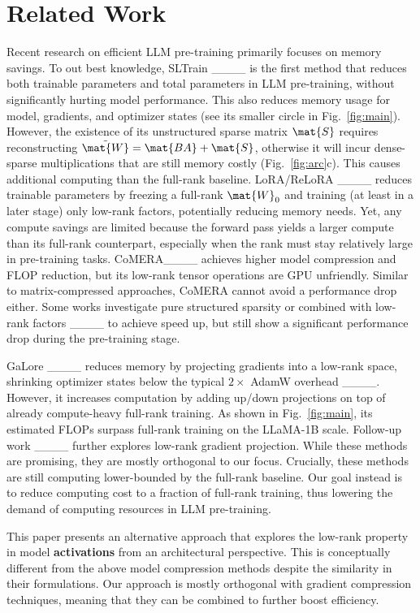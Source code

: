 \section{Related Work}
 Recent research on efficient LLM pre-training primarily focuses on memory savings. To out best knowledge, SLTrain ____ is the first method that reduces both trainable parameters and total parameters in LLM pre-training, without significantly hurting model performance. This also reduces memory usage for model, gradients, and optimizer states (see its smaller circle in Fig.~\ref{fig:main}). However, the existence of its unstructured sparse matrix $\mat{S}$ requires reconstructing $\tilde{\mat{W}} = \mat{BA} + \mat{S}$, otherwise it will incur dense-sparse multiplications that are still memory costly (Fig.~\ref{fig:arc}c). This causes additional computing than the full-rank baseline. LoRA/ReLoRA ____ reduces trainable parameters by freezing a full-rank $\mat{W}_0$ and training (at least in a later stage) only low-rank factors, potentially reducing memory needs. Yet, any compute savings are limited because the forward pass yields a larger compute than its full-rank counterpart, especially when the rank must stay relatively large in pre-training tasks. CoMERA____ achieves higher model compression and FLOP reduction, but its low-rank tensor operations are GPU unfriendly. Similar to matrix-compressed approaches, CoMERA cannot avoid a performance drop either. Some works investigate pure structured sparsity or combined with low-rank factors ____ to achieve speed up, but still show a significant performance drop during the pre-training stage.

\vspace{5pt}
 GaLore ____ reduces memory by projecting gradients into a low-rank space, shrinking optimizer states below the typical $2\times$ AdamW overhead ____. However, it increases computation by adding up/down projections on top of already compute-heavy full-rank training. As shown in Fig.~\ref{fig:main}, its estimated FLOPs surpass full-rank training on the LLaMA-1B scale. Follow-up work ____ further explores low-rank gradient projection. While these methods are promising, they are mostly orthogonal to our focus. Crucially, these methods are still computing lower-bounded by the full-rank baseline. Our goal instead is to reduce computing cost to a fraction of full-rank training, thus lowering the demand of computing resources in LLM pre-training.
 




This paper presents an alternative approach that explores the low-rank property in model {\bf activations} from an architectural perspective. This is conceptually different from the above model compression methods despite the similarity in their formulations. Our approach is mostly orthogonal with gradient compression techniques, meaning that they can be combined to further boost efficiency.